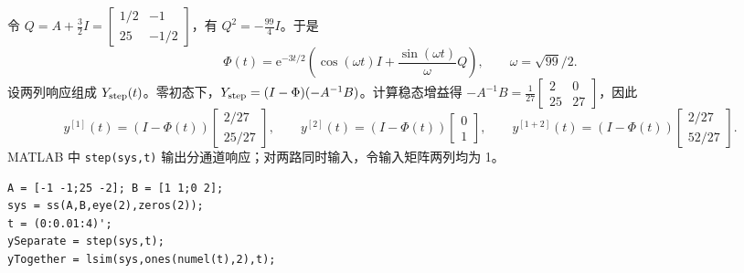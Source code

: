 

\sol 令 $Q=A+\frac32I=\begin{bmatrix}1/2&-1\\25&-1/2\end{bmatrix}$，有 $Q^2=-\frac{99}{4}I$。于是
\[
\Phi(t)=\mathrm e^{-3t/2}\left(\cos(\omega t)I+\frac{\sin(\omega t)}{\omega}Q\right),\qquad \omega=\sqrt{99}/2.
\]
设两列响应组成 $Y_{\rm step}(t)$。零初态下，$Y_{\rm step}=(I-\Phi)(-A^{-1}B)$。计算稳态增益得 $-A^{-1}B=\frac1{27}\begin{bmatrix}2&0\\25&27\end{bmatrix}$，因此
\[
y^{[1]}(t)=(I-\Phi(t))\begin{bmatrix}2/27\\25/27\end{bmatrix},\qquad
y^{[2]}(t)=(I-\Phi(t))\begin{bmatrix}0\\1\end{bmatrix},\qquad
y^{[1+2]}(t)=(I-\Phi(t))\begin{bmatrix}2/27\\52/27\end{bmatrix}.
\]
MATLAB 中 \texttt{step(sys,t)} 输出分通道响应；对两路同时输入，令输入矩阵两列均为 1。
\begin{verbatim}
A = [-1 -1;25 -2]; B = [1 1;0 2];
sys = ss(A,B,eye(2),zeros(2));
t = (0:0.01:4)';
ySeparate = step(sys,t);
yTogether = lsim(sys,ones(numel(t),2),t);
\end{verbatim}

